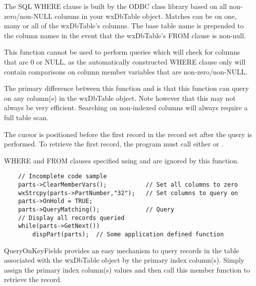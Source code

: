 
The SQL WHERE clause is built by the ODBC class library based on all 
non-zero/non-NULL columns in your wxDbTable object.  Matches can be on one, 
many or all of the wxDbTable's columns.  The base table name is prepended 
to the column names in the event that the wxDbTable's FROM clause is non-null.

This function cannot be used to perform queries which will check for 
columns that are 0 or NULL, as the automatically constructed WHERE clause 
only will contain comparisons on column member variables that are 
non-zero/non-NULL.

The primary difference between this function and  
is that this function can query on any column(s) in the wxDbTable object.  
Note however that this may not always be very efficient.  Searching on 
non-indexed columns will always require a full table scan.

The cursor is positioned before the first record in the record set after 
the query is performed.  To retrieve the first record, the program must call 
either  or 
.

WHERE and FROM clauses specified using  
and  are ignored by 
this function.


\begin{verbatim}
    // Incomplete code sample
    parts->ClearMemberVars();           // Set all columns to zero
    wxStrcpy(parts->PartNumber,"32");   // Set columns to query on
    parts->OnHold = TRUE;
    parts->QueryMatching();             // Query
    // Display all records queried
    while(parts->GetNext())
        dispPart(parts);  // Some application defined function
\end{verbatim}


\label{wxdbtablequeryonkeyfields}


QueryOnKeyFields provides an easy mechanism to query records in the table 
associated with the wxDbTable object by the primary index column(s).  Simply 
assign the primary index column(s) values and then call this member function 
to retrieve the record.  

